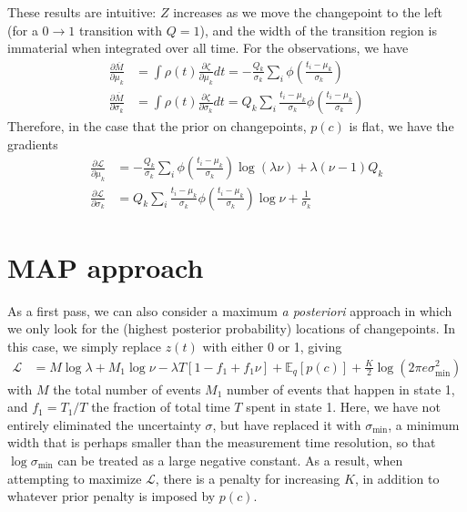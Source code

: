 \documentclass[11pt]{article}
\begin{document}
These results are intuitive: $Z$ increases as we move the changepoint to the left (for a $0 \rightarrow 1$ transition with $Q = 1$), and the width of the transition region is immaterial when integrated over all time. For the observations, we have
\begin{align}
    \frac{\partial \overline{M}}{\partial \mu_k} &= \int \rho(t) \frac{\partial \zeta}{\partial \mu_k} dt = -\frac{Q_k}{\sigma_k}\sum_i \phi\left( \frac{t_i - \mu_k}{\sigma_k}\right) \\
    \frac{\partial \overline{M}}{\partial \sigma_k} &= \int \rho(t) \frac{\partial \zeta}{\partial \sigma_k} dt = Q_k\sum_i \frac{t_i - \mu_k}{\sigma_k}\phi\left( \frac{t_i - \mu_k}{\sigma_k}\right)
\end{align}
Therefore, in the case that the prior on changepoints, $p(c)$ is flat, we have the gradients
\begin{align}
    \frac{\partial \mathcal{L}}{\partial \mu_k} &= -\frac{Q_k}{\sigma_k}\sum_i \phi\left( \frac{t_i - \mu_k}{\sigma_k}\right) \log (\lambda \nu)
    + \lambda (\nu - 1) Q_k \\
    \frac{\partial \mathcal{L}}{\partial \sigma_k} &=
    Q_k\sum_i \frac{t_i - \mu_k}{\sigma_k}\phi\left( \frac{t_i - \mu_k}{\sigma_k}\right) \log \nu + \frac{1}{\sigma_k}
\end{align}

\section{MAP approach}
As a first pass, we can also consider a maximum \emph{a posteriori} approach in which we only look for the (highest posterior probability) locations of changepoints. In this case, we simply replace $z(t)$ with either 0 or 1, giving
\begin{align}
    \mathcal{L} &= M \log \lambda + M_1 \log \nu - \lambda T [1 - f_1 + f_1 \nu] + \mathbb{E}_q[p(c)] + \frac{K}{2} \log (2\pi e\sigma^2_{\mathrm{min}})
\end{align}
with $M$ the total number of events $M_1$ number of events that happen in state 1, and $f_1 = T_1 / T$ the fraction of total time $T$ spent in state 1. Here, we have not entirely eliminated the uncertainty $\sigma$, but have replaced it with $\sigma_{\mathrm{min}}$, a minimum width that is perhaps smaller than the measurement time resolution, so that $\log \sigma_{\mathrm{min}}$ can be treated as a large negative constant. As a result, when attempting to maximize $\mathcal{L}$, there is a penalty for increasing $K$, in addition to whatever prior penalty is imposed by $p(c)$.
\end{document}
